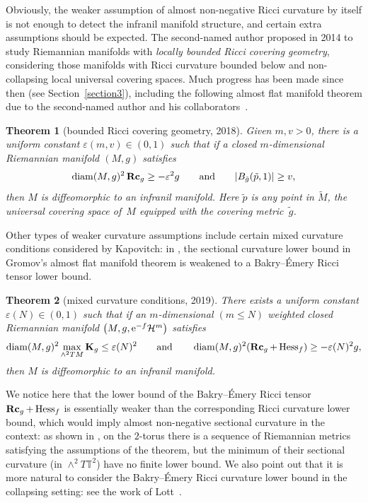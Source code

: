 \documentclass[pdftex]{sigma}
\numberwithin{equation}{section}
\newtheorem{Theorem}{Theorem}[section]
\DeclareMathOperator{\diam}{diam}
\newcommand{\Rc}{\operatorname{\bf Rc}}
\begin{document}
Obviously, the weaker assumption of almost non-negative Ricci
curvature by itself is not enough to detect the infranil manifold structure, and
certain extra assumptions should be expected. The second-named author proposed
in 2014 to study Riemannian manifolds with \emph{locally bounded Ricci covering
geometry}, considering those manifolds with Ricci curvature bounded below and
non-collapsing local universal covering spaces. Much progress has been made
since then (see Section~\ref{section3}), including the following almost flat manifold theorem due
to the second-named author and his collaborators~\cite{HKRX18}.
 \begin{Theorem}[bounded Ricci covering geometry, 2018]\label{thm:
HKRX18A} Given $m,v>0$, there is a uniform constant $\varepsilon(m,v)\in (0,1)$
such that if a closed $m$-dimensional Riemannian manifold $(M,g)$
sa\-tisfies
\begin{gather*}
\diam(M,g)^2\Rc_g \ge -\varepsilon^2 g\qquad\text{and}\qquad
 |B_{\tilde{g}}(\tilde{p}, 1) | \ge v,
\end{gather*}
then $M$ is diffeomorphic to an infranil manifold. Here $\tilde{p}$ is any
point in $\tilde{M}$, the universal covering space of~$M$ equipped
with the covering metric~$\tilde{g}$.
\end{Theorem}

Other types of weaker curvature assumptions include certain mixed curvature
conditions considered by Kapovitch: in \cite{Kapovitch19}, the sectional
curvature lower bound in Gromov's almost flat manifold theorem is weakened to a
Bakry--\'Emery Ricci tensor lower bound.
\begin{Theorem}[mixed curvature conditions, 2019]\label{thm: Kapovitch19}
There exists a uniform constant $\varepsilon(N) \in (0,1)$ such that if an
$m$-dimensional $(m\le N)$ weighted closed Riemannian manifold $\big(M,g,
{\rm e}^{-f}\mathcal{H}^m\big)$ satisfies
\begin{align*}
\diam(M,g)^2\max_{\wedge^2TM}\mathbf{K}_g \le \varepsilon(N)^2\qquad
\text{and}\qquad \diam(M,g)^2 (\Rc_g+\operatorname{Hess}_f ) \ge -\varepsilon(N)^2g,
\end{align*}
then $M$ is diffeomorphic to an infranil manifold.
\end{Theorem}
We notice here that the lower bound of the Bakry--\'Emery Ricci tensor
$\Rc_g+\operatorname{Hess}_f$ is essentially weaker than the corresponding Ricci curvature
lower bound, which would imply almost non-negative sectional curvature in the
context: as shown in \cite[Lemma~8.1]{Kapovitch19}, on the $2$-torus there is a
sequence of Riemannian metrics satisfying the assumptions of the theorem, but
the minimum of their sectional curvature (in $\wedge^2T\mathbb{T}^2$) have no
finite lower bound.
We also point out that it is more natural to consider the Bakry--\'Emery Ricci
curvature lower bound in the collapsing setting: see the work of Lott~\cite{Lott03}.
\end{document}

